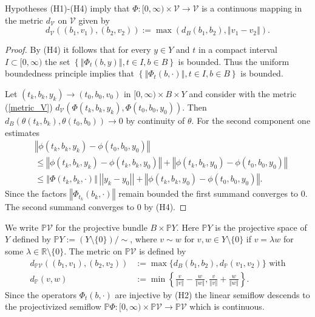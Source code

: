 \documentclass{siamltex}%
\begin{document}
\begin{proposition}
\label{Proposition_cont1}Hypotheses (H1)-(H4) imply that $\Phi:[0,\infty
)\times\mathcal{V}\rightarrow\mathcal{V}$ is a continuous mapping in the
metric $d_{\mathcal{V}}$ on $\mathcal{V}$ given by
\begin{equation}
d_{\mathcal{V}}((b_{1},v_{1}),(b_{2},v_{2})):=\max(d_{B}(b_{1},b_{2}%
),\left\Vert v_{1}-v_{2}\right\Vert ). \label{metric_V}%
\end{equation}

\end{proposition}

\begin{proof}
By (H4) it follows that for every $y\in Y$ and $t$ in a compact interval
$I\subset\lbrack0,\infty)$ the set $\left\{  \left\Vert \Phi_{t}%
(b,y)\right\Vert ,t\in I,b\in B\right\}  $ is bounded. Thus the uniform
boundedness principle implies that $\left\{  \left\Vert \Phi_{t}%
(b,\cdot)\right\Vert ,t\in I,b\in B\right\}  $ is bounded.

Let $(t_{k},b_{k},y_{k})\rightarrow(t_{0},b_{0},v_{0})$ in $[0,\infty)\times
B\times Y$ and consider with the metric (\ref{metric_V}) $d_{\mathcal{V}}%
(\Phi(t_{k},b_{k},y_{k}),\Phi(t_{0},b_{0},y_{0}))$. Then $d_{B}(\theta
(t_{k},b_{k}),\theta(t_{0},b_{0}))\rightarrow0$ by continuity of $\theta$. For
the second component one estimates
\begin{align*}
&  \left\Vert \phi(t_{k},b_{k},y_{k})-\phi(t_{0},b_{0},y_{0})\right\Vert \\
&  \leq\left\Vert \phi(t_{k},b_{k},y_{k})-\phi(t_{k},b_{k},y_{0})\right\Vert
+\left\Vert \phi(t_{k},b_{k},y_{0})-\phi(t_{0},b_{0},y_{0})\right\Vert \\
&  \leq\left\Vert \Phi(t_{k},b_{k},\cdot)\right\Vert \,\left\vert \left\vert
y_{k}-y_{0}\right\vert \right\vert +\left\Vert \phi(t_{k},b_{k},y_{0}%
)-\phi(t_{0},b_{0},y_{0})\right\Vert .
\end{align*}
Since the factors $\left\Vert \Phi_{t_{k}}(b_{k},\cdot)\right\Vert $ remain
bounded the first summand converges to $0$. The second summand converges to
$0$ by (H4).
\end{proof}

We write $\mathbb{P}\mathcal{V}$ for the projective bundle $B\times
\mathbb{P}Y$. Here $\mathbb{P}Y$ is the projective space of $Y$ defined by
$\mathbb{P}Y:=(Y\setminus\{0\})/\sim$, where $v\sim w$ for $v,w\in
Y\setminus\{0\}$ if $v=\lambda w$ for some $\lambda\in\mathbb{R}%
\setminus\{0\}$. The metric on $\mathbb{P}\mathcal{V}$ is defined by
\begin{align}
d_{\mathbb{P}\mathcal{V}}((b_{1},v_{1}),(b_{2},v_{2}))  &  :=\max\{d_{B}%
(b_{1},b_{2}),d_{\mathbb{P}}(v_{1},v_{2})\}\text{ with}\label{metric_P}\\
d_{\mathbb{P}}(v,w)  &  :=\min\left\{  \frac{v}{\left\Vert v\right\Vert
}-\frac{w}{\left\Vert w\right\Vert },\frac{v}{\left\Vert v\right\Vert }%
+\frac{w}{\left\Vert w\right\Vert }\right\}  .\nonumber
\end{align}
Since the operators $\Phi_{t}(b,\cdot)$ are injective by (H2) the linear
semiflow descends to the projectivized semiflow $\mathbb{P}\Phi:[0,\infty
)\times\mathbb{P}\mathcal{V}\rightarrow\mathbb{P}\mathcal{V}$ which is continuous.
\end{document}
